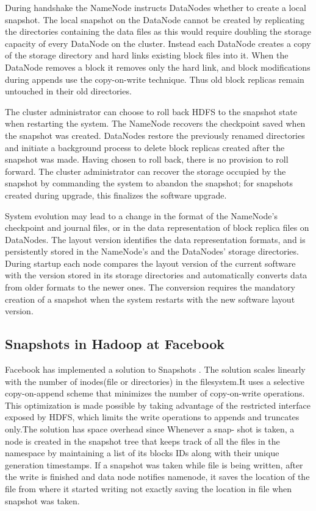 During handshake the NameNode instructs DataNodes whether to create a local snapshot. The local snapshot on the DataNode cannot be created by replicating the directories containing the data files as this would require doubling the storage capacity of every DataNode on the cluster. Instead each DataNode creates a copy of the storage directory and hard links existing block files into it. When the DataNode removes a block it removes only the hard link, and block modifications during appends use the copy-on-write technique. Thus old block replicas remain untouched in their old directories.

The cluster administrator can choose to roll back HDFS to the snapshot state when restarting the system. The NameNode recovers the checkpoint saved when the snapshot was created. DataNodes restore the previously renamed directories and initiate a background process to delete block replicas created after the snapshot was made. Having chosen to roll back, there is no provision to roll forward. The cluster administrator can recover the storage occupied by the snapshot by commanding the system to abandon the snapshot; for snapshots created during upgrade, this finalizes the software upgrade.

System evolution may lead to a change in the format of the NameNode's checkpoint and journal files, or in the data representation of block replica files on DataNodes. The layout version identifies the data representation formats, and is persistently stored in the NameNode's and the DataNodes' storage directories. During startup each node compares the layout version of the current software with the version stored in its storage directories and automatically converts data from older formats to the newer ones. The conversion requires the mandatory creation of a snapshot when the system restarts with the new software layout version.

\subsection{Snapshots in Hadoop at Facebook}
Facebook has implemented a solution to Snapshots \cite{Facebook}. The solution scales linearly with the number of inodes(file or directories) in the filesystem.It uses a selective copy-on-append scheme that minimizes the number of copy-on-write operations. This optimization is made possible by taking advantage of the restricted interface exposed by HDFS, which limits the write operations to appends and truncates only.The solution has space overhead since Whenever a snap-
shot is taken, a node is created in the snapshot tree  that keeps track of all the files in the
namespace by maintaining a list of its blocks IDs along with their unique generation timestamps.
If a snapshot was taken while file is being written, after the write is finished and data node notifies namenode, it saves the location of the file from  where it started writing not exactly saving the location in file when snapshot was taken.


 